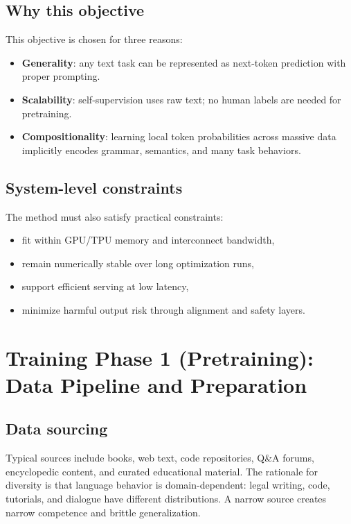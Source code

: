 \documentclass[12pt]{article}
\begin{document}
\subsection{Why this objective}

This objective is chosen for three reasons:
\begin{itemize}
    \item \textbf{Generality}: any text task can be represented as next-token prediction with proper prompting.
    \item \textbf{Scalability}: self-supervision uses raw text; no human labels are needed for pretraining.
    \item \textbf{Compositionality}: learning local token probabilities across massive data implicitly encodes grammar, semantics, and many task behaviors.
\end{itemize}

\subsection{System-level constraints}

The method must also satisfy practical constraints:
\begin{itemize}
    \item fit within GPU/TPU memory and interconnect bandwidth,
    \item remain numerically stable over long optimization runs,
    \item support efficient serving at low latency,
    \item minimize harmful output risk through alignment and safety layers.
\end{itemize}

\section{Training Phase 1 (Pretraining): Data Pipeline and Preparation}

\subsection{Data sourcing}

Typical sources include books, web text, code repositories, Q\&A forums, encyclopedic content, and curated educational material. The rationale for diversity is that language behavior is domain-dependent: legal writing, code, tutorials, and dialogue have different distributions. A narrow source creates narrow competence and brittle generalization.
\end{document}
